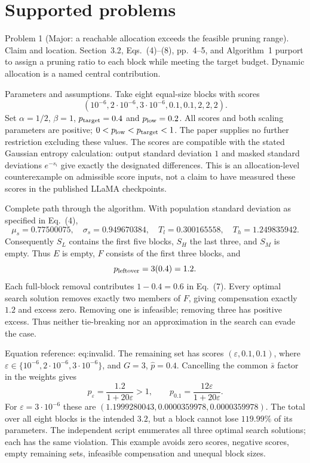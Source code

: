 \documentclass[10pt]{article}
\begin{document}
\section*{Supported problems}
Problem 1 (Major: a reachable allocation exceeds the feasible pruning range).  Claim and location. Section 3.2, Eqs. (4)–(8), pp. 4–5, and Algorithm 1 purport to assign a pruning ratio to each block while meeting the target budget. Dynamic allocation is a named central contribution.\par
Parameters and assumptions. Take eight equal-size blocks with scores \[(10^{-6},2\cdot10^{-6},3\cdot10^{-6},0.1,0.1,2,2,2).\] Set \(\alpha=1/2\), \(\beta=1\), \(p_{\rm target}=0.4\) and \(p_{\rm low}=0.2\). All scores and both scaling parameters are positive; \(0<p_{\rm low}<p_{\rm target}<1\). The paper supplies no further restriction excluding these values. The scores are compatible with the stated Gaussian entropy calculation: output standard deviation \(1\) and masked standard deviations \(e^{-s_i}\) give exactly the designated differences. This is an allocation-level counterexample on admissible score inputs, not a claim to have measured these scores in the published LLaMA checkpoints.\par
Complete path through the algorithm. With population standard deviation as specified in Eq. (4), \[\mu_s=0.77500075,\quad \sigma_s=0.949670384,\quad
 T_l=0.300165558,\quad T_h=1.249835942.\] Consequently \(S_L\) contains the first five blocks, \(S_H\) the last three, and \(S_M\) is empty. Thus \(E\) is empty, \(F\) consists of the first three blocks, and \[p_{\rm leftover}=3(0.4)=1.2.\] Each full-block removal contributes \(1-0.4=0.6\) in Eq. (7). Every optimal search solution removes exactly two members of \(F\), giving compensation exactly \(1.2\) and excess zero. Removing one is infeasible; removing three has positive excess. Thus neither tie-breaking nor an approximation in the search can evade the case.\par
Equation reference: eq:invalid. The remaining set has scores \((\varepsilon,0.1,0.1)\), where \(\varepsilon\in\{10^{-6},2\cdot10^{-6},3\cdot10^{-6}\}\), and \(G=3\), \(\widehat p=0.4\). Cancelling the common \(\bar s\) factor in the weights gives \[p_\varepsilon=\frac{1.2}{1+20\varepsilon}>1,\qquad
 p_{0.1}=\frac{12\varepsilon}{1+20\varepsilon}.
 \] For \(\varepsilon=3\cdot10^{-6}\) these are \((1.1999280043,0.0000359978,0.0000359978)\). The total over all eight blocks is the intended \(3.2\), but a block cannot lose \(119.99\%\) of its parameters. The independent script enumerates all three optimal search solutions; each has the same violation. This example avoids zero scores, negative scores, empty remaining sets, infeasible compensation and unequal block sizes.\par
\end{document}
